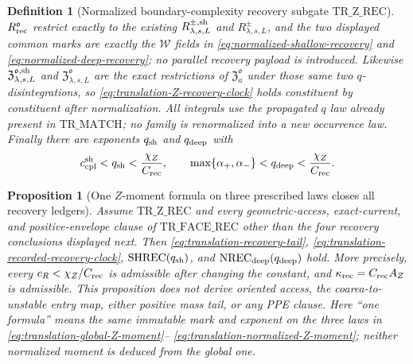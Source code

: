 \documentclass[11pt]{article}
\newtheorem{proposition}[theorem]{Proposition}
\newtheorem{definition}[theorem]{Definition}
\begin{document}
\begin{definition}[Normalized boundary-complexity recovery subgate
$\mathrm{TR\_Z\_REC}$]
$R_{\rm rec}^{\mathfrak o}$ restrict exactly to the existing
$R_{\lambda,s,L}^{\pm,\rm sh}$ and $R_{\lambda,s,L}^{\pm}$, and the two
displayed common marks are exactly the $\mathcal W$ fields in
\eqref{eq:normalized-shallow-recovery} and
\eqref{eq:normalized-deep-recovery}; no parallel recovery payload is
introduced.  Likewise
$\mathfrak Z_{\lambda,s,L}^{\mathfrak o,\rm sh}$ and
$\mathfrak Z_{\lambda,s,L}^{\mathfrak o}$ are the exact restrictions of
$\mathfrak Z_a^{\mathfrak o}$ under those same two $q$-disintegrations, so
\eqref{eq:translation-Z-recovery-clock} holds constituent by constituent
after normalization.  All integrals use the propagated $q$ law already present in
$\mathrm{TR\_MATCH}$; no family is renormalized into a new occurrence law.
Finally there are exponents $q_{\rm sh}$ and $q_{\rm deep}$ with
\begin{equation}
\label{eq:translation-Z-rate-window}
 c_{\rm cpl}^{\rm sh}<q_{\rm sh}<\frac{\chi_Z}{C_{\rm rec}},
 \qquad
 \max\{\alpha_+,\alpha_-\}<q_{\rm deep}
 <\frac{\chi_Z}{C_{\rm rec}}.
\end{equation}
\end{definition}

\begin{proposition}[One $Z$-moment formula on three prescribed laws closes all recovery ledgers]
\label{prop:translation-Z-closes-recovery}
Assume $\mathrm{TR\_Z\_REC}$ and every geometric-access, exact-current, and
positive-envelope clause of $\mathrm{TR\_FACE\_REC}$ other than the four
recovery conclusions displayed next.  Then
\eqref{eq:translation-recovery-tail},
\eqref{eq:translation-recorded-recovery-clock},
$\mathrm{SHREC}(q_{\rm sh})$, and
$\mathrm{NREC}_{\rm deep}(q_{\rm deep})$ hold.  More precisely, every
$c_R<\chi_Z/C_{\rm rec}$ is admissible after changing the constant, and
$\kappa_{\rm rec}=C_{\rm rec}A_Z$ is admissible.  This proposition does not
derive oriented access, the coarea-to-unstable entry map, either positive
mass tail, or any PPE clause.
Here ``one formula'' means the same immutable mark and exponent on the three
laws in \eqref{eq:translation-global-Z-moment}--
\eqref{eq:translation-normalized-Z-moment}; neither normalized moment is
deduced from the global one.
\end{proposition}
\end{document}
